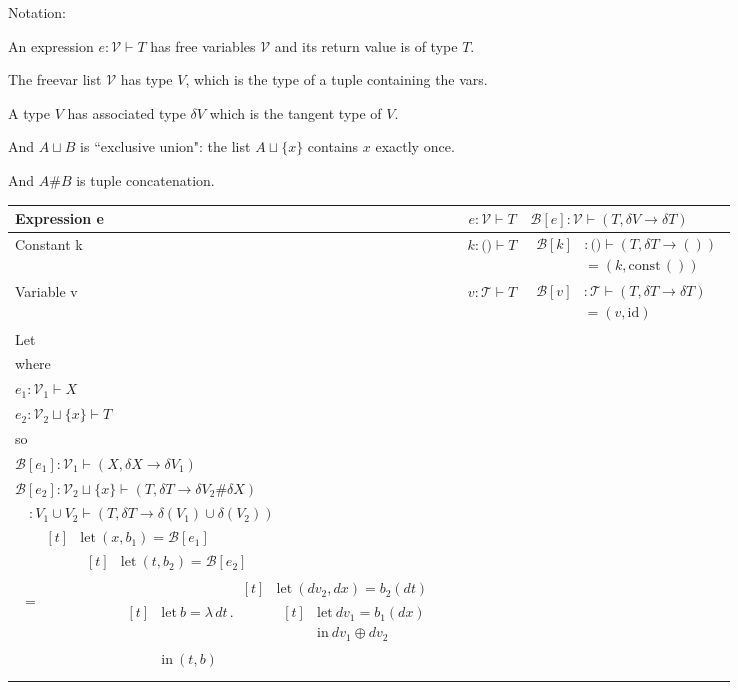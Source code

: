 \documentclass[10pt]{article}
\newcommand{\fn}[1]{\mathrm{#1}}
\newcommand{\vars}[1]{\mathcal{#1}}
\newcommand{\B}[1]{\mathcal{B}[#1]}
\newcommand{\dd}[1]{\delta #1}
\def\V{\vars V}
\newcommand{\typed}[3]{#1 : \vars #2 \vdash #3}
\newcommand{\typeddef}[4]{
\begin{aligned}
#1 &: \vars #2 \vdash #3 \\ 
 &= #4
\end{aligned}
}
\def\type#1:#2|-#3{\typed{#1}{#2}{#3}}
\def\Let#1=#2#3{\textrm{let}~ #1 = #2 ~\textrm{in}~ #3}
\def\LET#1=#2#3{\begin{aligned}[t] &\textrm{let}~ #1 = #2\\ &#3 \end{aligned}}
\def\LETin#1=#2#3{\LET{#1}={#2}{\textrm{in}~ #3}}
\def\LAM#1.#2{\lambda \, #1 \,.\, #2}
\begin{document}
Notation: 

An expression $e : \V \vdash T$ has free variables $\V$ and its return value is of type $T$.

The freevar list $\V$ has type $V$, which is the type of a tuple containing the vars.

A type $V$ has associated type $\dd V$ which is the tangent type of $V$.

And $A \sqcup B$ is ``exclusive union": the list $A \sqcup \{x\}$ contains $x$ exactly once.

\def\concat{\#}
And $A \concat B$ is tuple concatenation.

\bigskip

\begin{tabular}[t]{l|c|p{70mm}}
  Expression e &
  $\type e : V |- T$
  &
  $\type \B{e} : V |- {(T, \dd{V} \to \dd{T})}$ \\

  \hline

  Constant k &
       $\type k : () |- T$ &
       $\typeddef{\B{k}}{()}{(T, \dd{T} \to ())}{(k,\fn{const} \, ())}$     \\

  \hline
  Variable v &
      $\typed{v}{T}{T}$ &
      $\typeddef{\B{v}}{T}{(T, \dd{T} \to \dd{T})}{(v,\fn{id})}$  \\

  \hline

  Let&
  \makecell{
    $\typed{\Let x = {e_1}{e_2}}{V_1 \cup V_2}{T}$\\
where\\[2pt]
    $\typed{e_1}{V_1}{X}$ \\
    $\typed{e_2}{V_2 \sqcup \{x\}}{T}$\\
so\\
    $\typed{\B{e_1}}{V_1}{(X, \dd{X} \to \dd{V_1})}$ \\
    $\typed{\B{e_2}}{V_2 \sqcup \{x\}}{(T, \dd{T} \to \dd{V_2} \concat \dd{X})}$
  }
  &
  \makecell[l] {
    $\B{\Let  x_1 = {e_1}{e_2}}$ \\
    ~~$ : V_1 \cup V_2 \vdash (T, \dd{T} \to \dd(V_1) \cup \dd(V_2))$ \\
    $~~=\LET (x, b_1) = {\B{e_1}}
    {\LET (t, b_2) = {\B{e_2}}
     {\LETin b = {\LAM dt . \LET (dv_2, dx) = {b_2(dt)}
					{\LETin dv_1 = {b_1(dx)} 
					 {dv_1 \oplus dv_2}}}
	   {(t, b)}}}
    $
  }
  \\
  \hline


\end{tabular}
\end{document}
